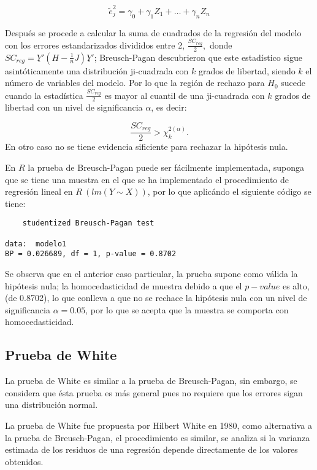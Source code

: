 \documentclass[
  a4paper,
  oneside,
  openany]{book}
\begin{document}
\[\tilde{e}_{j}^{2}=\gamma_{0}+\gamma_{1}Z_{1}+ \ldots + \gamma_{n}Z_{n}\]

Después se procede a calcular la suma de cuadrados de la regresión del modelo con los errores estandarizados divididos entre 2, \(\frac{SC_{reg}}{2},\) donde \(SC_{reg}=\underline{Y}'(H-\frac{1}{n}J)\underline{Y}'\); Breusch-Pagan descubrieron que este estadístico sigue asintóticamente una distribución ji-cuadrada con \(k\) grados de libertad, siendo \(k\) el número de variables del modelo. Por lo que la región de rechazo para \(H_0\) sucede cuando la estadística \(\frac{SC_{reg}}{2}\) es mayor al cuantil de una ji-cuadrada con \(k\) grados de libertad con un nivel de significancia \(\alpha\), es decir:

\[\frac{SC_{reg}}{2}> \chi^{2(\alpha)}_{k}.\]
En otro caso no se tiene evidencia sificiente para rechazar la hipótesis nula.

En \(R\) la prueba de Breusch-Pagan puede ser fácilmente implementada, suponga que se tiene una muestra en el que se ha implementado el procedimiento de regresión lineal en \(R \ (lm(Y \sim X))\), por lo que aplicándo el siguiente código se tiene:

\begin{verbatim}
    studentized Breusch-Pagan test

data:  modelo1
BP = 0.026689, df = 1, p-value = 0.8702
\end{verbatim}

Se observa que en el anterior caso particular, la prueba supone como válida la hipótesis nula; la homocedasticidad de muestra debido a que el \(p-value\) es alto, (de 0.8702), lo que conlleva a que no se rechace la hipótesis nula con un nivel de significancia \(\alpha=0.05\), por lo que se acepta que la muestra se comporta con homocedasticidad.

\hypertarget{prueba-de-white}{%
\subsection{Prueba de White}\label{prueba-de-white}}

La prueba de White es similar a la prueba de Breusch-Pagan, sin embargo, se considera que ésta prueba es más general pues no requiere que los errores sigan una distribución normal.

La prueba de White fue propuesta por Hilbert White en 1980, como alternativa a la prueba de Breusch-Pagan, el procedimiento es similar, se analiza si la varianza estimada de los residuos de una regresión depende directamente de los valores obtenidos.
\end{document}
